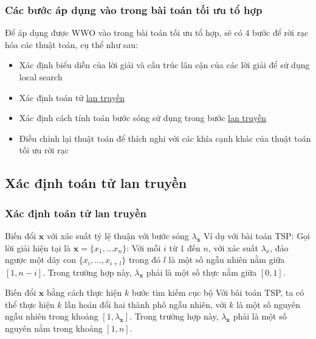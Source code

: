 \begin{frame}
    \frametitle{Các bước áp dụng vào trong bài toán tối ưu tổ hợp}
    Để áp dụng được WWO vào trong bài toán tối ưu tổ hợp, sẽ có 4 bước để rời rạc hóa các thuật toán, cụ thể như sau:
    \begin{itemize}
        \item Xác định biểu diễn của lời giải và cấu trúc lân cận của các lời giải để sử dụng local search
        \item Xác định toán tử \hyperlink{frame:propagation}{lan truyền}
        \item Xác định cách tính toán bước sóng sử dụng trong bước \hyperlink{frame:propagation}{lan truyền}
        \item Điều chỉnh lại thuật toán để thích nghi với các khía cạnh khác của thuật toán tối ưu rời rạc
    \end{itemize}
\end{frame}

\subsection{Xác định toán tử lan truyền}
\begin{frame}
    \frametitle{Xác định toán tử lan truyền}
    \begin{block}{Biến đổi $\mathbf{x}$ với xác suất tỷ lệ thuận với bước sóng $\lambda_{\mathbf{x}}$}
        Ví dụ với bài toán TSP: Gọi lời giải hiện tại là $\mathbf{x} = \{x_1, ... x_n\}$: Với mỗi $i$ từ $1$ đến $n$, với xác suất $\lambda_{x}$, đảo ngược một dãy con $\{x_i, ..., x_{i + l}\}$ trong đó $l$ là một số ngẫu nhiên nằm giữa $[1, n - i]$. Trong trường hợp này, $\lambda_\mathbf{x}$ phải là một số thực nằm giữa $[0, 1]$.
    \end{block}
    \begin{block}{Biến đổi $\mathbf{x}$ bằng cách thực hiện $k$ bước tìm kiếm cục bộ}
        Với bài toán TSP, ta có thể thực hiện $k$ lần hoán đổi hai thành phố ngẫu nhiên, với $k$ là một số nguyên ngẫu nhiên trong khoảng $[1, \lambda_\mathbf{x}]$. Trong trường hợp này, $\lambda_\mathbf{x}$ phải là một số nguyên nằm trong khoảng $[1, n]$.
    \end{block}
\end{frame}


